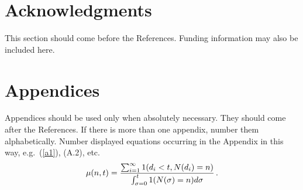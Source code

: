\documentclass{ws-ijait}
\begin{document}
\section*{Acknowledgments}

This section should come before the References. Funding
information may also be included here.

\appendix

\section{Appendices}

Appendices should be used only when absolutely necessary. They
should come after the References. If there is more than one
appendix, number them alphabetically. Number displayed equations
occurring in the Appendix in this way, e.g.~(\ref{a1}), (A.2),
etc.
\begin{equation}
\mu(n, t) = {\sum^\infty_{i=1} 1(d_i < t, N(d_i) = n) \over
\int^t_{\sigma=0} 1(N(\sigma) = n)d\sigma}\,. \label{a1}
\end{equation}
\end{document}
